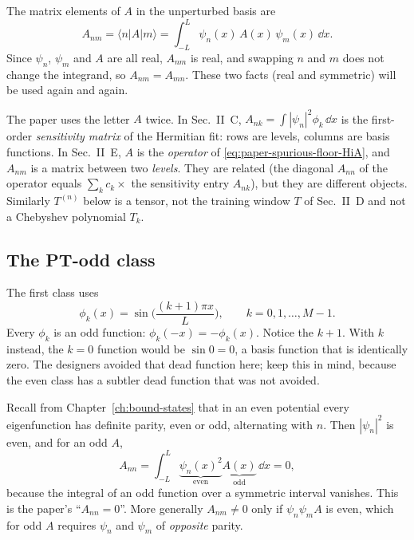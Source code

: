 The matrix elements of $A$ in the unperturbed basis are
\begin{equation}
A_{nm}=\langle n|A|m\rangle=\int_{-L}^{L}\psi_n(x)\,A(x)\,\psi_m(x)\,\dd x .\label{eq:paper-spurious-floor-Anm}
\end{equation}
Since $\psi_n$, $\psi_m$ and $A$ are all real, $A_{nm}$ is real, and swapping $n$ and $m$ does not change the integrand, so $A_{nm}=A_{mn}$. These two facts (real and symmetric) will be used again and again.

\begin{pitfall}
The paper uses the letter $A$ twice. In Sec.~II~C, $A_{nk}=\int|\psi_n|^2\phi_k\,\dd x$ is the first-order \emph{sensitivity matrix} of the Hermitian fit: rows are levels, columns are basis functions. In Sec.~II~E, $A$ is the \emph{operator} of \cref{eq:paper-spurious-floor-HiA}, and $A_{nm}$ is a matrix between two \emph{levels}. They are related (the diagonal $A_{nn}$ of the operator equals $\sum_k c_k\times$ the sensitivity entry $A_{nk}$), but they are different objects. Similarly $T^{(n)}$ below is a tensor, not the training window $T$ of Sec.~II~D and not a Chebyshev polynomial $T_k$.
\end{pitfall}

\subsection{The PT-odd class}

The first class uses
\begin{equation}
\phi_k(x)=\sin\!\Big(\frac{(k+1)\pi x}{L}\Big),\qquad k=0,1,\dots,M-1.\label{eq:paper-spurious-floor-odd}
\end{equation}
Every $\phi_k$ is an odd function: $\phi_k(-x)=-\phi_k(x)$. Notice the $k+1$. With $k$ instead, the $k=0$ function would be $\sin 0=0$, a basis function that is identically zero. The designers avoided that dead function here; keep this in mind, because the even class has a subtler dead function that was not avoided.

Recall from Chapter~\ref{ch:bound-states} that in an even potential every eigenfunction has definite parity, even or odd, alternating with $n$. Then $|\psi_n|^2$ is even, and for an odd $A$,
\begin{equation}
A_{nn}=\int_{-L}^{L}\underbrace{\psi_n(x)^2}_{\text{even}}\underbrace{A(x)}_{\text{odd}}\,\dd x=0,\label{eq:paper-spurious-floor-Ann0}
\end{equation}
because the integral of an odd function over a symmetric interval vanishes. This is the paper's ``$A_{nn}=0$''. More generally $A_{nm}\neq0$ only if $\psi_n\psi_m A$ is even, which for odd $A$ requires $\psi_n$ and $\psi_m$ of \emph{opposite} parity.


